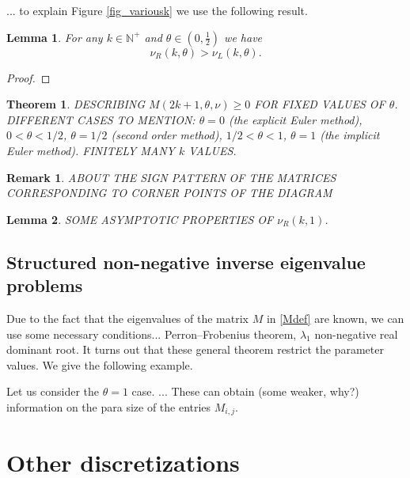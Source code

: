 \documentclass[a4paper]{article}
\newtheorem{theorem}{Theorem}
\newtheorem{lemma}{Lemma}
\newtheorem{remark}{Remark}
\newcommand{\te}{\theta}
\newcommand{\nul}{\nu_L(k,\theta)}
\newcommand{\nur}{\nu_R(k,\theta)}
\newcommand{\nplus}{\mathbb{N}^+}
\begin{document}
... to explain Figure \ref{fig_variousk} we use the following result.
\begin{lemma}
For any $k\in\nplus$ and $\te\in\left(0,\frac{1}{2}\right)$ we have 
\[
 \nur>\nul.
\] 
\end{lemma}
\begin{proof}
\end{proof}

\begin{theorem}
DESCRIBING $M(2k+1,\te,\nu)\ge 0 $ FOR FIXED VALUES OF $\te$.
DIFFERENT CASES TO MENTION:
$\te=0$ (the explicit Euler method), $0<\te<1/2$, $\te=1/2$ (second order method), $1/2<\te<1$, $\te=1$ (the implicit Euler method). FINITELY MANY $k$ VALUES.
\end{theorem}

\begin{remark}
ABOUT THE SIGN PATTERN OF THE MATRICES CORRESPONDING TO CORNER POINTS OF THE DIAGRAM
\end{remark}


\begin{lemma}
SOME ASYMPTOTIC PROPERTIES OF $\nu_R(k,1)$.
\end{lemma}



\subsection{Structured non-negative inverse eigenvalue problems}

Due to the fact that the eigenvalues of the matrix $M$ in \eqref{Mdef} are known, we can use some necessary conditions... Perron--Frobenius theorem, $\lambda_1$ non-negative real dominant root. 
It turns out that these general theorem restrict the parameter values. We give the following example.

Let us consider the $\te=1$ case. ...
These  can obtain (some weaker, why?) information on the para size of the entries $M_{i,j}$.

\section{Other discretizations}
\end{document}

